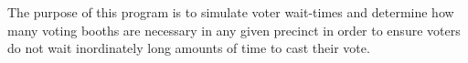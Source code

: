 The purpose of this program is to simulate voter wait-times and determine how many voting booths are necessary in any given precinct in order to ensure voters do not wait inordinately long amounts of time to cast their vote.